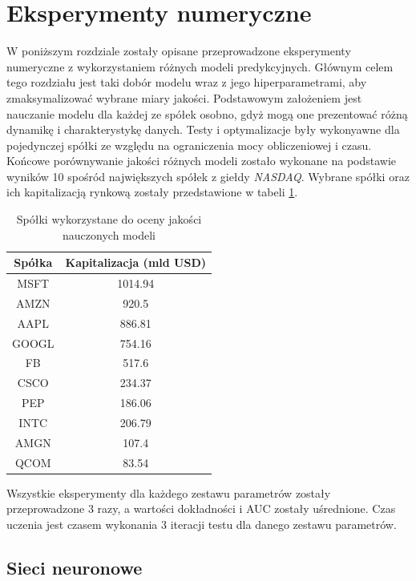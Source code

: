 \documentclass[a4paper, twoside, 11pt, openright]{article}
\begin{document}
\newpage

\section{Eksperymenty numeryczne}

W poniższym rozdziale zostały opisane przeprowadzone eksperymenty numeryczne z wykorzystaniem różnych modeli predykcyjnych. Głównym celem tego rozdziału jest taki dobór modelu wraz z jego hiperparametrami, aby zmaksymalizować wybrane miary jakości. Podstawowym założeniem jest nauczanie modelu dla każdej ze spółek osobno, gdyż mogą one prezentować różną dynamikę i charakterystykę danych. Testy i optymalizacje były wykonyawne dla pojedynczej spółki ze względu na ograniczenia mocy obliczeniowej i czasu. Końcowe porównywanie jakości różnych modeli zostało wykonane na podstawie wyników 10 spośród największych spółek z giełdy \textit{NASDAQ}. Wybrane spółki oraz ich kapitalizacją rynkową zostały przedstawione w tabeli \ref{tab:biggest_companies}.


\begin{table}[H]
    \centering
    \begin{tabular}{|c|c|}
    \hline
        \textbf{Spółka} & \textbf{Kapitalizacja (mld USD)} \\ \hline
        MSFT & 1014.94 \\ \hline 
        AMZN & 920.5 \\ \hline 
        AAPL & 886.81 \\ \hline 
        GOOGL & 754.16 \\ \hline 
        FB & 517.6 \\ \hline 
        CSCO & 234.37 \\ \hline 
        PEP & 186.06 \\ \hline 
        INTC & 206.79 \\ \hline 
        AMGN & 107.4 \\ \hline 
        QCOM & 83.54 \\ \hline 
    \end{tabular}
    \caption{Spółki wykorzystane do oceny jakości nauczonych modeli}
    \label{tab:biggest_companies}
\end{table}

Wszystkie eksperymenty dla każdego zestawu parametrów zostały przeprowadzone 3 razy, a wartości dokładności i AUC zostały uśrednione. Czas uczenia jest czasem wykonania 3 iteracji testu dla danego zestawu parametrów.

\subsection{Sieci neuronowe}
\end{document}

